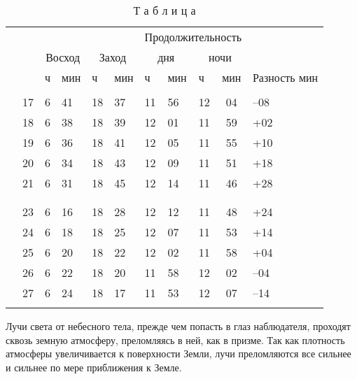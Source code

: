 \begin{center}
\begin{table*}[t]
    \captionsetup{justification=raggedleft, singlelinecheck=false, position=above}
    \caption*{Т а б л и ц а}
    \centering
    \small
    \begin{tabular}{|>{\raggedleft}p{2cm} m{0.5cm}  m{0.8cm} m{0.8cm} m{0.8cm} m{0.8cm} m{0.8cm} m{0.8cm} m{0.8cm} c >{\centering\arraybackslash}m{1.3cm}|}
         \hline
          & & & & & & \multicolumn{4}{c}{Продолжительность} & \\
          & & \multicolumn{2}{c}{Восход} & \multicolumn{2}{c}{Заход} & \multicolumn{2}{c}{дня} & \multicolumn{2}{c}{ночи} & \\
           & & ч & мин & ч & мин & ч & мин & ч & мин & Разность мин \\
          \hline
          
          \multirow{7}{*}{Март\vspace{2cm}} & & & & & & & & & & \\
          & 17 & 6 & 41 & 18 & 37 & 11 & 56 & 12 & 04 & --08 \\
          & 18 & 6 & 38 & 18 & 39 & 12 & 01 & 11 & 59 & +02 \\
          & 19 & 6 & 36 & 18 & 41 & 12 & 05 & 11 & 55 & +10 \\
          & 20 & 6 & 34 & 18 & 43 & 12 & 09 & 11 & 51 & +18 \\
          & 21 & 6 & 31 & 18 & 45 & 12 & 14 & 11 & 46 & +28 \\
          & & & & & & & & & & \\

          \hline
          \multirow{7}{*}{Сентябрь\vspace{2cm}} & & & & & & & & & & \\ 
          & 23 & 6 & 16 & 18 & 28 & 12 & 12 & 11 & 48 & +24 \\
          & 24 & 6 & 18 & 18 & 25 & 12 & 07 & 11 & 53 & +14 \\
          & 25 & 6 & 20 & 18 & 22 & 12 & 02 & 11 & 58 & +04 \\
          & 26 & 6 & 22 & 18 & 20 & 11 & 58 & 12 & 02 & --04 \\
          & 27 & 6 & 24 & 18 & 17 & 11 & 53 & 12 & 07 & --14 \\
          & & & & & & & & & & \\
          
          \hline
    \end{tabular}
    \label{tab:table}
\end{table*}
\end{center}

\vspace{-20pt}
Лучи света от небесного тела, прежде чем попасть в глаз наблюдателя, проходят сквозь земную атмосферу, преломляясь в ней, как в призме. Так как плотность атмосферы увеличивается к поверхности Земли, лучи преломляются все сильнее и сильнее по мере приближения к Земле.

\lipsum[1-3]

\fancyhf{}
\pagestyle{fancy}